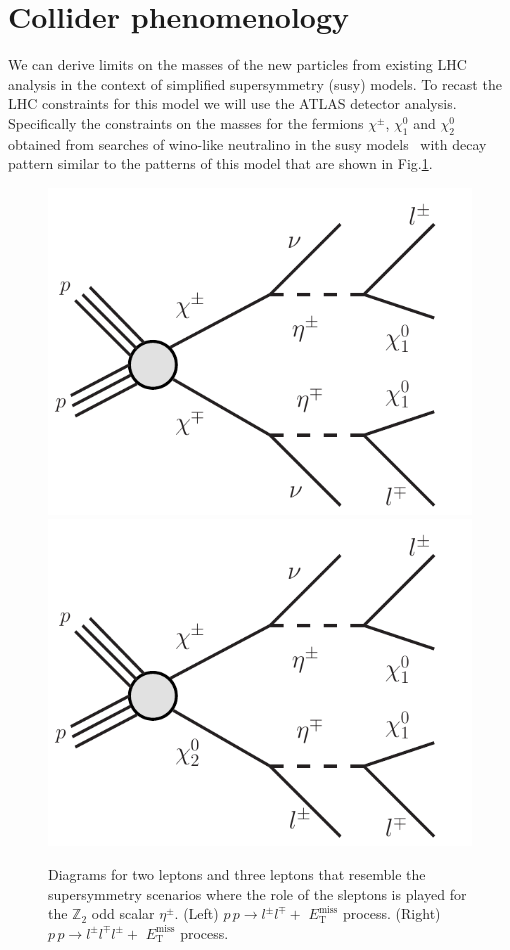 \documentclass[12pt,letterpaper]{article}
\begin{document}
\section{Collider phenomenology}
\label{sec:collider}

We can derive limits on the masses of the new particles from existing LHC analysis in the context of simplified supersymmetry (susy) models. 
To recast the LHC constraints for this model we will use the ATLAS detector analysis. Specifically the constraints on the masses for the fermions $\chi^{\pm}$, $\chi_1^0$ and  $\chi_2^0$ obtained from searches of wino-like neutralino in the susy models~\cite{Aaboud:2018jiw} with decay pattern similar to the patterns of this model that are shown in Fig.\ref{fig:collider-diagrams}.
\begin{figure}[h]
\begin{center}
\includegraphics[scale=0.6]{chi1chi1}
\includegraphics[scale=0.6]{chi1chi20}
\caption{Diagrams for two leptons and three leptons that resemble the supersymmetry scenarios where the role of the sleptons is played for the  $\mathbb{Z}_2$ odd scalar $\eta^{\pm}$. (Left) $p\,p \to l^{\pm}l^{\mp}+$ $E_{\text{T}}^{\text{miss}}$ process. (Right) $p\,p \to l^{\pm}l^{\mp}l^{\pm}+$ $E_{\text{T}}^{\text{miss}}$ process. }
\label{fig:collider-diagrams}
\end{center}
\end{figure}
\end{document}
